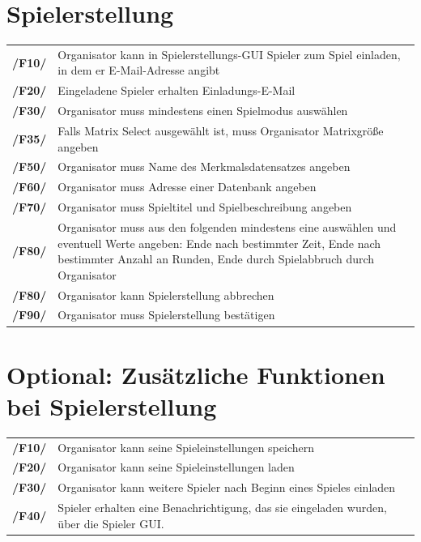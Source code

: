\documentclass[a4paper]{scrreprt}
\begin{document}
    \section{Spielerstellung}
    \begin{tabularx}{\linewidth}{@{}>{\bfseries}l@{\hspace{.5em}}X@{}} 
    /F10/ & \Gls{Organisator} kann in Spielerstellungs-GUI \Gls{Spieler} zum Spiel einladen, in dem er E-Mail-Adresse angibt \\
    /F20/ & Eingeladene \Gls{Spieler} erhalten Einladungs-E-Mail \\
    /F30/ & \Gls{Organisator} muss mindestens einen \Gls{Spielmodus} auswählen\\
    /F35/ & Falls Matrix Select ausgewählt ist, muss \Gls{Organisator} Matrixgröße angeben \\
    /F50/ & \Gls{Organisator} muss Name des Merkmalsdatensatzes angeben \\
    /F60/ & \Gls{Organisator} muss Adresse einer Datenbank angeben \\ %
    /F70/ & \Gls{Organisator} muss Spieltitel und Spielbeschreibung angeben \\ %
    /F80/ & \Gls{Organisator} muss aus den folgenden mindestens eine auswählen und eventuell Werte angeben: Ende nach bestimmter Zeit, Ende nach bestimmter Anzahl an Runden, Ende durch Spielabbruch durch Organisator \\
    /F80/ & \Gls{Organisator} kann Spielerstellung abbrechen \\
    /F90/ & \Gls{Organisator} muss Spielerstellung bestätigen \\
    \end{tabularx}
    
    \section{Optional: Zusätzliche Funktionen bei Spielerstellung}
    \begin{tabularx}{\linewidth}{@{}>{\bfseries}l@{\hspace{.5em}}X@{}} %
    /F10/ & \Gls{Organisator} kann seine \Gls{Spieleinstellungen} speichern \\
    /F20/ & \Gls{Organisator} kann seine \Gls{Spieleinstellungen} laden \\
    /F30/ & \Gls{Organisator} kann weitere \Gls{Spieler} nach Beginn eines Spieles einladen \\
    /F40/ & \Gls{Spieler} erhalten eine Benachrichtigung, das sie eingeladen wurden, über die Spieler GUI.\\
	\end{tabularx}
    
\end{document}
